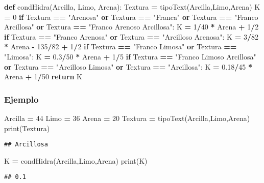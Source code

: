\documentclass[
]{article}
\newenvironment{Shaded}{\begin{snugshade}}{\end{snugshade}}
\newcommand{\BuiltInTok}[1]{#1}
\newcommand{\ControlFlowTok}[1]{\textcolor[rgb]{0.13,0.29,0.53}{\textbf{#1}}}
\newcommand{\DecValTok}[1]{\textcolor[rgb]{0.00,0.00,0.81}{#1}}
\newcommand{\FloatTok}[1]{\textcolor[rgb]{0.00,0.00,0.81}{#1}}
\newcommand{\KeywordTok}[1]{\textcolor[rgb]{0.13,0.29,0.53}{\textbf{#1}}}
\newcommand{\NormalTok}[1]{#1}
\newcommand{\OperatorTok}[1]{\textcolor[rgb]{0.81,0.36,0.00}{\textbf{#1}}}
\newcommand{\StringTok}[1]{\textcolor[rgb]{0.31,0.60,0.02}{#1}}
\begin{document}
\begin{Shaded}
\begin{Highlighting}[]
\KeywordTok{def}\NormalTok{ condHidra(Arcilla, Limo, Arena):}
\NormalTok{  Textura }\OperatorTok{=}\NormalTok{ tipoText(Arcilla,Limo,Arena)}
\NormalTok{  K }\OperatorTok{=} \DecValTok{0}
  \ControlFlowTok{if}\NormalTok{ Textura }\OperatorTok{==} \StringTok{"Arenosa"} \KeywordTok{or}\NormalTok{ Textura }\OperatorTok{==} \StringTok{"Franca"} \KeywordTok{or}\NormalTok{ Textura }\OperatorTok{==} \StringTok{"Franco Arcillosa"} \KeywordTok{or}\NormalTok{ Textura }\OperatorTok{==} \StringTok{"Franco Arenoso Arcillosa"}\NormalTok{:}
\NormalTok{    K }\OperatorTok{=} \DecValTok{1}\OperatorTok{/}\DecValTok{40} \OperatorTok{*}\NormalTok{ Arena }\OperatorTok{+} \DecValTok{1}\OperatorTok{/}\DecValTok{2}
  \ControlFlowTok{if}\NormalTok{ Textura }\OperatorTok{==} \StringTok{"Franco Arenosa"} \KeywordTok{or}\NormalTok{ Textura }\OperatorTok{==} \StringTok{"Arcilloso Arenosa"}\NormalTok{:}
\NormalTok{    K }\OperatorTok{=} \DecValTok{3}\OperatorTok{/}\DecValTok{82} \OperatorTok{*}\NormalTok{ Arena }\OperatorTok{{-}} \DecValTok{135}\OperatorTok{/}\DecValTok{82} \OperatorTok{+} \DecValTok{1}\OperatorTok{/}\DecValTok{2}
  \ControlFlowTok{if}\NormalTok{ Textura }\OperatorTok{==} \StringTok{"Franco Limosa"} \KeywordTok{or}\NormalTok{ Textura }\OperatorTok{==} \StringTok{"Limosa"}\NormalTok{:}
\NormalTok{    K }\OperatorTok{=} \FloatTok{0.3}\OperatorTok{/}\DecValTok{50} \OperatorTok{*}\NormalTok{ Arena }\OperatorTok{+} \DecValTok{1}\OperatorTok{/}\DecValTok{5}
  \ControlFlowTok{if}\NormalTok{ Textura }\OperatorTok{==} \StringTok{"Franco Limoso Arcillosa"} \KeywordTok{or}\NormalTok{ Textura }\OperatorTok{==} \StringTok{"Arcilloso Limosa"} \KeywordTok{or}\NormalTok{ Textura }\OperatorTok{==} \StringTok{"Arcillosa"}\NormalTok{:}
\NormalTok{    K }\OperatorTok{=} \FloatTok{0.18}\OperatorTok{/}\DecValTok{45} \OperatorTok{*}\NormalTok{ Arena }\OperatorTok{+} \DecValTok{1}\OperatorTok{/}\DecValTok{50}
  \ControlFlowTok{return}\NormalTok{ K}
\end{Highlighting}
\end{Shaded}

\hypertarget{ejemplo}{%
\subsubsection{Ejemplo}\label{ejemplo}}

\begin{Shaded}
\begin{Highlighting}[]
\NormalTok{Arcilla }\OperatorTok{=} \DecValTok{44}
\NormalTok{Limo }\OperatorTok{=} \DecValTok{36}
\NormalTok{Arena }\OperatorTok{=} \DecValTok{20}
\NormalTok{Textura }\OperatorTok{=}\NormalTok{ tipoText(Arcilla,Limo,Arena)}
\BuiltInTok{print}\NormalTok{(Textura)}
\end{Highlighting}
\end{Shaded}

\begin{verbatim}
## Arcillosa
\end{verbatim}

\begin{Shaded}
\begin{Highlighting}[]
\NormalTok{K }\OperatorTok{=}\NormalTok{ condHidra(Arcilla,Limo,Arena)}
\BuiltInTok{print}\NormalTok{(K)}
\end{Highlighting}
\end{Shaded}

\begin{verbatim}
## 0.1
\end{verbatim}
\end{document}
